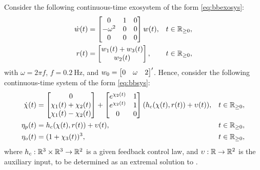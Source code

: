 \begin{example}
  Consider the following continuous-time exosystem of the form \eqref{eq:bbexosys}:
  \begin{subequations}
    \label{eq:nlall_simexo}
    \begin{align}
      \dot{w}(t) &= \begin{bmatrix} 0 & 1 & 0\\ -\omega^2 & 0 & 0 \\ 0 & 0 & 0 \end{bmatrix} w(t), & t\in\mathbb{R}_{\geq 0},\\
      r(t) &= \begin{bmatrix} w_1(t) + w_3(t) \\ w_2(t) \end{bmatrix}, & t\in\mathbb{R}_{\geq 0},
    \end{align}
  \end{subequations}
  with $\omega=2\pi f$, $f=\SI{0.2}{\hertz}$, and $w_0 = \begin{bmatrix} 0 & \omega & 2 \end{bmatrix}'$. Hence, consider the following continuous-time system of the form \eqref{eq:bbsys}:
  \begin{subequations}
    \label{eq:nlall_simplant}
    \begin{align}
      \dot{\chi}(t) &= \begin{bmatrix} 0 \\ \chi_1(t)+\chi_2(t) \\ \chi_1(t)-\chi_2(t) \end{bmatrix} + \begin{bmatrix} e^{\chi_2(t)} & 1 \\ e^{\chi_2(t)} & 1 \\ 0 & 0 \end{bmatrix} (h_c(\chi(t),r(t))+\upsilon(t)), & t\in\mathbb{R}_{\geq 0},\\
      \eta_p(t) &= h_c(\chi(t),r(t)) + \upsilon(t), & t\in\mathbb{R}_{\geq 0},\\
      \eta_o(t) &= (1+\chi_3(t))^3, & t\in\mathbb{R}_{\geq 0},
    \end{align}
  \end{subequations}
  where $h_c : \mathbb{R}^3\times\mathbb{R}^3 \rightarrow \mathbb{R}^2$ is a given feedback control law, and $\upsilon : \mathbb{R} \rightarrow \mathbb{R}^2$ is the auxiliary input, to be determined as an extremal solution to .


\end{example}
